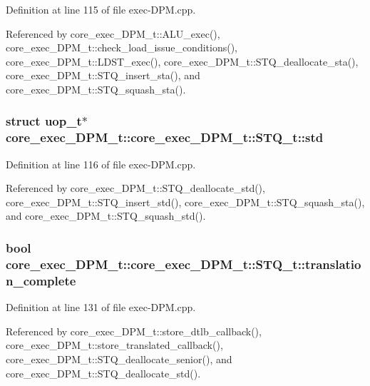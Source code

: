 Definition at line 115 of file exec-DPM.cpp.

Referenced by core\_\-exec\_\-DPM\_\-t::ALU\_\-exec(), core\_\-exec\_\-DPM\_\-t::check\_\-load\_\-issue\_\-conditions(), core\_\-exec\_\-DPM\_\-t::LDST\_\-exec(), core\_\-exec\_\-DPM\_\-t::STQ\_\-deallocate\_\-sta(), core\_\-exec\_\-DPM\_\-t::STQ\_\-insert\_\-sta(), and core\_\-exec\_\-DPM\_\-t::STQ\_\-squash\_\-sta().
\subsubsection[{std}]{\setlength{\rightskip}{0pt plus 5cm}struct {\bf uop\_\-t}$\ast$ core\_\-exec\_\-DPM\_\-t::core\_\-exec\_\-DPM\_\-t::STQ\_\-t::std\hspace{0.3cm}{\tt  [read]}}\label{structcore__exec__DPM__t_1_1STQ__t_e0344449b4f8eef6b241aa620f0ae4ec}




Definition at line 116 of file exec-DPM.cpp.

Referenced by core\_\-exec\_\-DPM\_\-t::STQ\_\-deallocate\_\-std(), core\_\-exec\_\-DPM\_\-t::STQ\_\-insert\_\-std(), core\_\-exec\_\-DPM\_\-t::STQ\_\-squash\_\-sta(), and core\_\-exec\_\-DPM\_\-t::STQ\_\-squash\_\-std().
\subsubsection[{translation\_\-complete}]{\setlength{\rightskip}{0pt plus 5cm}bool core\_\-exec\_\-DPM\_\-t::core\_\-exec\_\-DPM\_\-t::STQ\_\-t::translation\_\-complete}\label{structcore__exec__DPM__t_1_1STQ__t_877df377f0f978281a76644e31f9fd96}




Definition at line 131 of file exec-DPM.cpp.

Referenced by core\_\-exec\_\-DPM\_\-t::store\_\-dtlb\_\-callback(), core\_\-exec\_\-DPM\_\-t::store\_\-translated\_\-callback(), core\_\-exec\_\-DPM\_\-t::STQ\_\-deallocate\_\-senior(), and core\_\-exec\_\-DPM\_\-t::STQ\_\-deallocate\_\-std().
